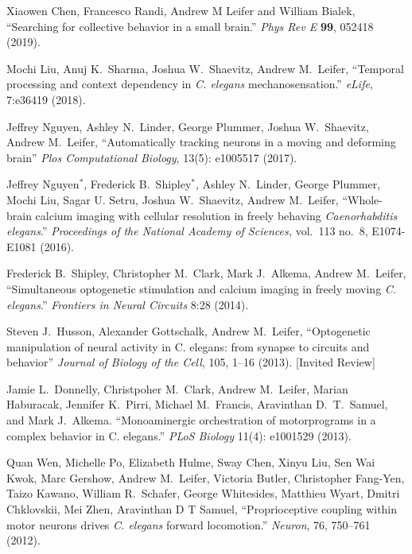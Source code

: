 \documentclass[11pt]{article}
\makeatletter
\newlength{\bibhang}
\newlength{\bibsep}
\newcounter{Lcount}
 {\@listi \global\bibsep\itemsep \global\advance\bibsep by\parsep}
\newenvironment{bibsection}%
        {\begin{list}{\arabic{Lcount}.}{%
       \usecounter{Lcount}%
       \setlength\labelwidth{-0.5em}%
       \setlength{\leftmargin}{\bibhang}%
       \setlength{\itemindent}{-\leftmargin}%
       \setlength{\itemsep}{\bibsep}%
       \setlength{\parsep}{\z@}%
        \setlength{\partopsep}{0pt}%
        \setlength{\topsep}{0pt}}}
        {\end{list}\vspace{-.6\baselineskip}}
\makeatother
\begin{document}
\begin{bibsection}
\item Xiaowen Chen, Francesco Randi, Andrew M Leifer and William Bialek, ``Searching for collective behavior in a small brain.'' \emph{Phys Rev E} \textbf{99}, 052418 (2019).

\item Mochi Liu, Anuj K.~Sharma, Joshua W.~Shaevitz, Andrew M.~Leifer, ``Temporal processing and context dependency in \textit{C. elegans} mechanosensation.'' \emph{eLife}, 7:e36419 (2018).   

\item Jeffrey Nguyen,  Ashley N.~Linder, George Plummer, Joshua
W.~Shaevitz, Andrew M.~Leifer, ``Automatically tracking neurons in a moving and deforming brain'' \emph{Plos Computational Biology}, 13(5): e1005517 (2017).
	
\item Jeffrey Nguyen$^{*}$, Frederick B.~Shipley$^{*}$, Ashley N.~Linder, George Plummer, Mochi Liu, Sagar U. Setru, Joshua
W.~Shaevitz, Andrew M.~Leifer, ``Whole-brain calcium imaging with cellular resolution in freely behaving \textit{Caenorhabditis elegans}.'' \emph{Proceedings of the National Academy of Sciences,}  vol.~113 no.~8, E1074-E1081 (2016). 

\item Frederick B.~Shipley, Christopher M.~Clark,  Mark J.~Alkema, Andrew M.~Leifer, ``Simultaneous optogenetic stimulation and calcium imaging in freely moving \textit{C. elegans}.'' \emph{Frontiers in Neural Circuits} 8:28 (2014).
	
\item Steven J.~Husson, Alexander Gottschalk, Andrew M.~Leifer, ``Optogenetic manipulation of neural activity in C. elegans: from synapse to circuits and behavior'' \emph{Journal of Biology of the Cell}, 105, 1--16 (2013).  [Invited Review]

\item Jamie L.~Donnelly, Christpoher M.~Clark, Andrew M.~Leifer, Marian Haburacak, Jennifer K.~Pirri, Michael M.~Francis, Aravinthan D.~T.~Samuel, and Mark J.~Alkema. ``Monoaminergic orchestration of motorprograms in a complex behavior in C. elegans.'' \emph{PLoS Biology}  11(4): e1001529 (2013).	

\item Quan Wen, Michelle Po, Elizabeth Hulme, Sway Chen, Xinyu Liu, Sen Wai Kwok, Marc Gershow,  Andrew M.~Leifer, Victoria Butler, Christopher Fang-Yen, Taizo Kawano, William R.~Schafer, George Whitesides, Matthieu Wyart, Dmitri Chklovskii, Mei Zhen, Aravinthan D T Samuel, ``Proprioceptive coupling within motor neurons drives \emph{C. elegans} forward locomotion.'' \emph{Neuron}, 76, 750--761 (2012).


\end{bibsection}
\end{document}
